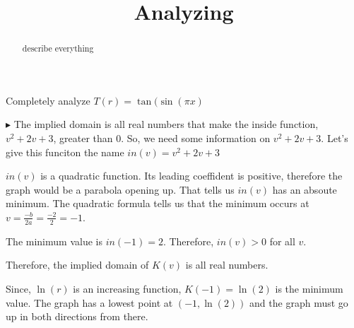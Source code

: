 \documentclass{ximera}
\title{Analyzing}
\begin{document}
\begin{abstract}
describe everything
\end{abstract}
\maketitle







Completely analyze $T(r) = \tan(\sin(\pi x)$

$\blacktriangleright$  The implied domain is all real numbers that make the inside function, $v^2+2v+3$, greater than $0$.  So, we need some information on $v^2+2v+3$.   Let's give this funciton the name $in(v) = v^2+2v+3$

$in(v)$ is a quadratic function.  Its leading coeffident is positive, therefore the graph would be a parabola opening up.  That tells us $in(v)$ has an absoute minimum.  The quadratic formula tells us that the minimum occurs at $v=\frac{-b}{2a} = \frac{-2}{2} = -1$.

The minimum value is $in(-1) = 2$.  Therefore, $in(v) > 0$ for all $v$.

Therefore, the implied domain of $K(v)$ is all real numbers.

Since, $\ln(r)$ is an increasing function, $K(-1) = \ln(2)$ is the minimum value.  The graph has a lowest point at $(-1, \ln(2))$ and the graph must go up in both directions from there.
\end{document}
